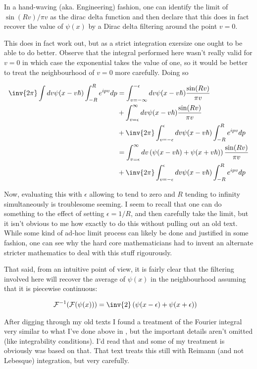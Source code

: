 \documentclass{article}
\newcommand{\FF}[0]{\mathcal{F}}
\begin{document}
In a hand-waving (aka. Engineering) fashion, one can identify the limit of $\sin(Rv)/\pi v$ as the dirac delta function and
then declare that this does in fact recover the value of $\psi(x)$ by a Dirac delta filtering around the point $v=0$.

This does in fact work out, but as a strict integration exersize one ought to be able to do better.
Observe that the integral performed here wasn't really valid for $v=0$ in which case the exponential takes the value of one, so it would be
better to treat the neighbourhood of $v=0$ more carefully.  Doing so

\begin{align*}
\inv{{2\pi}} \int dv \psi(x -v\hbar) \int_{-R}^R e^{i p v} dp 
&= \int_{v=-\infty}^{-\epsilon} dv \psi(x - v\hbar) \frac{\sin(R v)}{\pi v} \\
&+ \int_{v=\epsilon}^\infty dv \psi(x - v\hbar) \frac{\sin(R v)}{\pi v} \\
&+ \inv{{2\pi}} \int_{v=-\epsilon}^\epsilon dv \psi(x - v\hbar) \int_{-R}^R e^{i p v} dp \\
&= \int_{v=\epsilon}^\infty dv \left( \psi(x - v\hbar) +\psi(x + v\hbar) \right) \frac{\sin(R v)}{\pi v} \\
&+ \inv{{2\pi}} \int_{v=-\epsilon}^\epsilon dv \psi(x - v\hbar) \int_{-R}^R e^{i p v} dp \\
\end{align*}

Now, evaluating this with $\epsilon$ allowing to tend to zero and $R$ tending to infinity simultaneously is troublesome seeming.  I seem to recall that one
can do something to the effect of setting $\epsilon=1/R$, and then carefully take the limit, but it isn't obvious to me how exactly to do this without
pulling out an old text.
While some kind of ad-hoc limit process can likely be done and justified in some fashion, one can see why the hard core mathematicians had to invent
an alternate stricter mathematics to deal with this stuff rigourously.

That said, from an intuitive point of view, it is fairly clear that the filtering involved here will recover the average of
$\psi(x)$ in the neighbourhood assuming that it is piecewise continuous:

\begin{align*}
\FF^{-1}(\FF(\psi(x))) &= \inv{2} \left( \psi(x -\epsilon) + \psi(x + \epsilon) \right)
\end{align*}

After digging through my old texts I found a treatment of the Fourier integral very similar to what I've done above
in \cite{lepage1980cva}, but the important details aren't omitted (like integrability conditions).
I'd read that and some of my treatment is obviously was based on that.  That text 
treats this still with Reimann (and not Lebesque) integration, but very carefully.
\end{document}
